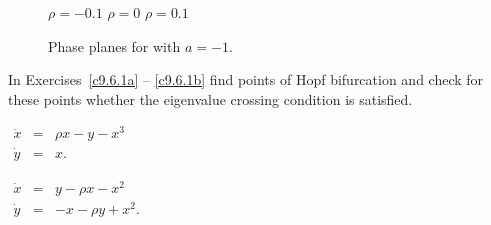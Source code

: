 \begin{figure}[htb]
           \centerline{%
           }
 	\vspace*{-0.2in}
	\hspace{0.3in} $\rho=-0.1$  \hspace{1.7in} $\rho=0$
		\hspace{1.8in} $\rho=0.1$ 
          \caption{Phase planes for \protect{} with $a=-1$.}
           \label{F:nonlinhopf}
\end{figure}



\EXER

\TEXER

\noindent In Exercises~\ref{c9.6.1a} -- \ref{c9.6.1b} find points of Hopf
bifurcation and check for these points whether the eigenvalue crossing
condition  is satisfied.
\begin{exercise} \label{c9.6.1a}
$\begin{array}{rcl}
\dot{x} & = & \rho x - y -x^3 \\
\dot{y} & = & x.
\end{array}$
\end{exercise}
\begin{exercise} \label{c9.6.1b}
$\begin{array}{rcl}
\dot{x} & = & y - \rho x - x^2   \\
\dot{y} & = & -x - \rho y + x^2.
\end{array}$
\end{exercise}



































